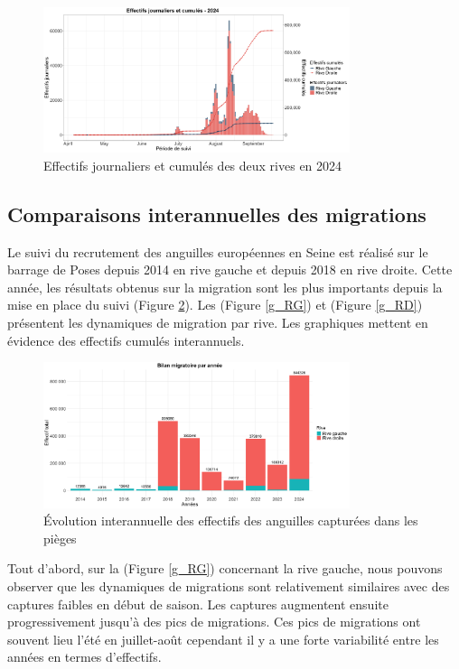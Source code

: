 \documentclass[11pt,titlepage,twoside]{article}\usepackage[]{graphicx}\usepackage[table]{xcolor}
\begin{document}
\begin{figure}[htpb]
\centering
\includegraphics[width=0.8\textwidth]{graph_oral.png}
\caption{Effectifs journaliers et cumulés des deux rives en 2024}
\label{graph_oral}
\end{figure}

\subsection{Comparaisons interannuelles des migrations}

Le suivi du recrutement des anguilles européennes en Seine est réalisé sur le barrage de Poses depuis 2014 en rive gauche et depuis 2018 en rive droite.  Cette année, les résultats obtenus sur la migration sont les plus importants depuis la mise en place du suivi (Figure \ref{graph_annee_oral}). Les (Figure \ref{g_RG}) et (Figure \ref{g_RD}) présentent les dynamiques de migration par rive. Les graphiques mettent en évidence des effectifs cumulés interannuels. 


\begin{figure}[htpb]
\centering
\includegraphics[width=0.8\textwidth]{graph_annee_oral.png}
\caption{Évolution interannuelle des effectifs des anguilles capturées dans les pièges}
\label{graph_annee_oral}
\end{figure}

Tout d’abord, sur la (Figure \ref{g_RG}) concernant la rive gauche, nous pouvons observer que les dynamiques de migrations sont relativement similaires avec des captures faibles en début de saison. Les captures augmentent ensuite progressivement jusqu’à des pics de migrations.   Ces pics de migrations ont souvent lieu l’été en juillet-août cependant il y a une forte variabilité entre les années en termes d’effectifs.
\end{document}
